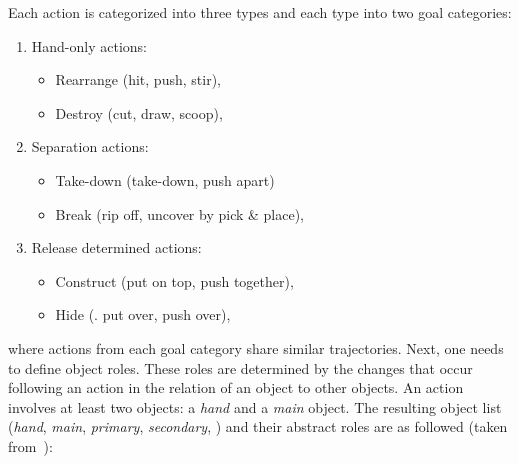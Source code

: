 Each action is categorized into three types and each type into two goal categories:

\begin{enumerate}
  \item Hand-only actions:
    \begin{itemize}
      \item Rearrange (\eg hit, push, stir),
      \item Destroy (\eg cut, draw, scoop),
    \end{itemize}
  \item Separation actions:
    \begin{itemize}
      \item Take-down (\eg take-down, push apart)
      \item Break (\eg rip off, uncover by pick \& place),
    \end{itemize}
  \item Release determined actions:
    \begin{itemize}
      \item Construct (\eg put on top, push together),
      \item Hide (\eg. put over, push over),
    \end{itemize}
\end{enumerate}

where actions from each goal category share similar trajectories.
Next, one needs to define object roles.
These roles are determined by the changes that occur following an action in the relation of an object to other objects. 
An action involves at least two objects: a \emph{hand} and a \emph{main} object. 
The resulting object list (\emph{hand}, \emph{main}, \emph{primary}, \emph{secondary}, \etc) and their abstract roles are as followed (taken from~\textcite{reichaeinwoergoetter2018}):


